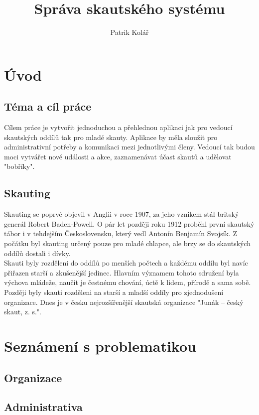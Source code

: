\documentclass{article}
\title{Správa skautského systému}
\author{Patrik Kolář}
\date{}
\begin{document}
\maketitle
\newpage

\tableofcontents
\newpage

\section{Úvod}
\subsection{Téma a cíl práce}
Cílem práce je vytvořit jednoduchou a přehlednou aplikaci jak pro vedoucí skautských oddílů tak pro mladé skauty. Aplikace by měla sloužit pro administrativní potřeby a komunikaci mezi jednotlivými členy. Vedoucí tak budou moci vytvářet nové události a akce, zaznamenávat účast skautů a udělovat "bobříky".
\subsection{Skauting}
Skauting se poprvé objevil v Anglii v roce 1907, za jeho vznikem stál britský generál Robert Baden-Powell. O pár let později roku 1912 proběhl první skautský tábor i v tehdejším Československu, který vedl Antonín Benjamín Svojsík. Z počátku byl skauting určený pouze pro mladé chlapce, ale brzy se do skautských oddílů dostali i dívky. \\
Skauti byly rozděleni do oddílů po menších počtech a každému oddílu byl navíc přiřazen starší a zkušenější jedinec. Hlavním významem tohoto sdružení byla výchova mládeže, naučit je čestnému chování, úctě k lidem, přírodě a sama sobě. \\
Později byly skauti rozděleni na starší a mladší oddíly pro zjednodušení organizace. Dnes je v česku nejrozšířenější skautská organizace  "Junák – český skaut, z. s.".

\section{Seznámení s problematikou}
\subsection{Organizace}
\subsection{Administrativa}
\end{document}
